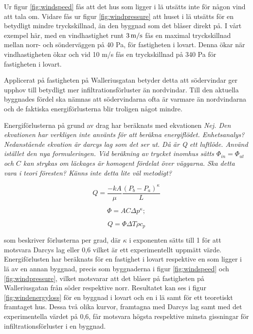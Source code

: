 Ur figur \ref{fig:windspeed} fås att det hus som ligger i lä utsätts inte för någon vind att tala om.
 Vidare fås ur figur \ref{fig:windpressure} att huset i lä utsätts för en betydligt mindre 
 tryckskillnad, än den byggnad som det blåser direkt på. I vårt exempel här, med en 
 vindhastighet runt $\unit[3]{m/s}$ fås en maximal tryckskillnad mellan norr- och sönderväggen 
 på 40 Pa, för fastigheten i lovart. Denna ökar när vindhastigheten ökar och vid 10 m/s fås en 
 tryckskillnad på 340 Pa för fastigheten i lovart. 

Applicerat på fastigheten på Walleriusgatan betyder detta att södervindar ger upphov till 
betydligt mer infiltrationsförluster än nordvindar. Till den aktuella byggnades fördel ska nämnas 
att södervindarna ofta är varmare än nordvindarna och de faktiska energiförlusterna blir 
troligen något mindre.


Energiförlusterna på grund av drag har beräknats med ekvationen \emph{\color{red} Nej. Den ekvationen har verkligen
inte använts för att beräkna energiflödet. Enhetsanalys? Nedanstående ekvation är darcys lag som det ser ut. Då är Q
ett luftlöde. Använd istället den nya formuleringen. Vid beräkning av trycket inomhus sätts 
$\Phi_{in} = \Phi_{ut}$ och $C$ kan strykas om läckages är homogent fördelat över väggarna. Ska detta vara i teori föresten?
Känns inte detta lite väl metodigt?}

\begin{equation}
Q=\frac{-kA}{\mu} \frac{(P_b - P_a)^\kappa}{L} 
\end{equation}

\begin{equation}
\Phi = AC\Delta p^\kappa;
\end{equation}

\begin{equation}
Q = \Phi\Delta T \rho c_p
\end{equation}


som beskriver förlusterna per grad, där $\kappa$ i exponenten sätts till 1 för att motsvara
 Darcys lag eller 0,6 vilket är ett experimentellt uppmätt värde. Energiförlusten har beräknats
  för en fastighet i lovart respektive en som ligger i lä av en annan byggnad, precis som 
  byggnaderna i figur \ref{fig:windspeed} och \ref{fig:windpressure}, vilket motsvarar att det 
  blåser på fastigheten på Walleriusgatan från söder respektive norr. Resultatet kan ses i figur 
  \ref{fig:windenergyloss} för en byggnad i lovart och en i lä samt för ett teoretiskt framtaget hus. Dessa två olika kurvor, framtagna med Darcys lag samt med det experimentella värdet på 
  0,6, får motsvara högsta respektive minsta gissningar för infiltrationsförluster i en byggnad. 

